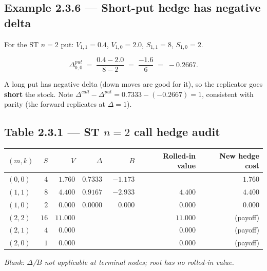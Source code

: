 \documentclass[
  10pt,
  twoside]{book}
\newcounter{none} %
\begin{document}
\subsection{Example 2.3.6 --- Short-put hedge has negative
delta}\label{example-2.3.6-short-put-hedge-has-negative-delta}

For the ST \(n=2\) put: \(V_{1,1}=0.4\), \(V_{1,0}=2.0\), \(S_{1,1}=8\),
\(S_{1,0}=2\).

\[
\Delta^{put}_{0,0} \;=\; \frac{0.4 - 2.0}{8 - 2} \;=\; \frac{-1.6}{6} \;=\; -0.2667.
\]

A long put has negative delta (down moves are good for it), so the
replicator goes \textbf{short} the stock. Note
\(\Delta^{call}-\Delta^{put}=0.7333-(-0.2667)=1\), consistent with
parity (the forward replicates at \(\Delta=1\)).

\subsection{\texorpdfstring{Table 2.3.1 --- ST \(n=2\) call hedge
audit}{Table 2.3.1 --- ST n=2 call hedge audit}}\label{table-2.3.1-st-n2-call-hedge-audit}

{\def\LTcaptype{none} %
\begin{table}[H]
\centering
\begin{tabular}{|l|r|r|r|r|r|r|}
\toprule
\((m,k)\) & \(S\) & \(V\) & \(\Delta\) & \(B\) & Rolled-in value & New hedge cost \\
\midrule



\((0,0)\) & \(\phantom{0}4\) & \(\phantom{0}1.760\) & \(0.7333\) &
\(-1.173\) & & \(1.760\) \\
\((1,1)\) & \(\phantom{0}8\) & \(\phantom{0}4.400\) & \(0.9167\) &
\(-2.933\) & \(4.400\) & \(4.400\) \\
\((1,0)\) & \(\phantom{0}2\) & \(\phantom{0}0.000\) & \(0.0000\) &
\(\phantom{-}0.000\) & \(0.000\) & \(0.000\) \\
\((2,2)\) & \(16\) & \(11.000\) & & & \(11.000\) & (payoff) \\
\((2,1)\) & \(\phantom{0}4\) & \(\phantom{0}0.000\) & & &
\(\phantom{0}0.000\) & (payoff) \\
\((2,0)\) & \(\phantom{0}1\) & \(\phantom{0}0.000\) & & &
\(\phantom{0}0.000\) & (payoff) \\
\bottomrule
\end{tabular}
\end{table}
}

\emph{Blank: \(\Delta\)/\(B\) not applicable at terminal nodes; root has
no rolled-in value.}
\end{document}
